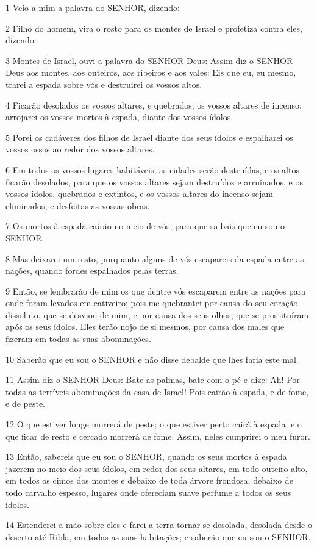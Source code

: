 \par 1 Veio a mim a palavra do SENHOR, dizendo:
\par 2 Filho do homem, vira o rosto para os montes de Israel e profetiza contra eles, dizendo:
\par 3 Montes de Israel, ouvi a palavra do SENHOR Deus: Assim diz o SENHOR Deus aos montes, aos outeiros, aos ribeiros e aos vales: Eis que eu, eu mesmo, trarei a espada sobre vós e destruirei os vossos altos.
\par 4 Ficarão desolados os vossos altares, e quebrados, os vossos altares de incenso; arrojarei os vossos mortos à espada, diante dos vossos ídolos.
\par 5 Porei os cadáveres dos filhos de Israel diante dos seus ídolos e espalharei os vossos ossos ao redor dos vossos altares.
\par 6 Em todos os vossos lugares habitáveis, as cidades serão destruídas, e os altos ficarão desolados, para que os vossos altares sejam destruídos e arruinados, e os vossos ídolos, quebrados e extintos, e os vossos altares do incenso sejam eliminados, e desfeitas as vossas obras.
\par 7 Os mortos à espada cairão no meio de vós, para que saibais que eu sou o SENHOR.
\par 8 Mas deixarei um resto, porquanto alguns de vós escapareis da espada entre as nações, quando fordes espalhados pelas terras.
\par 9 Então, se lembrarão de mim os que dentre vós escaparem entre as nações para onde foram levados em cativeiro; pois me quebrantei por causa do seu coração dissoluto, que se desviou de mim, e por causa dos seus olhos, que se prostituíram após os seus ídolos. Eles terão nojo de si mesmos, por causa dos males que fizeram em todas as suas abominações.
\par 10 Saberão que eu sou o SENHOR e não disse debalde que lhes faria este mal.
\par 11 Assim diz o SENHOR Deus: Bate as palmas, bate com o pé e dize: Ah! Por todas as terríveis abominações da casa de Israel! Pois cairão à espada, e de fome, e de peste.
\par 12 O que estiver longe morrerá de peste; o que estiver perto cairá à espada; e o que ficar de resto e cercado morrerá de fome. Assim, neles cumprirei o meu furor.
\par 13 Então, sabereis que eu sou o SENHOR, quando os seus mortos à espada jazerem no meio dos seus ídolos, em redor dos seus altares, em todo outeiro alto, em todos os cimos dos montes e debaixo de toda árvore frondosa, debaixo de todo carvalho espesso, lugares onde ofereciam suave perfume a todos os seus ídolos.
\par 14 Estenderei a mão sobre eles e farei a terra tornar-se desolada, desolada desde o deserto até Ribla, em todas as suas habitações; e saberão que eu sou o SENHOR.


